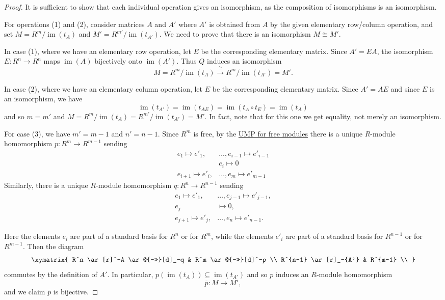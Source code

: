 \documentclass[12pt]{report}
\numberwithin{equation}{section}
\numberwithin{theorem}{chapter}
\theoremstyle{definition}
\newtheorem*{basic properties}{Basic Properties}
\newtheorem*{Important Remark}{Important Remark}
\DeclareMathOperator{\im}{im}
\begin{document}
\begin{proof}
It is sufficient to show that each individual operation gives an isomorphism, as the composition of isomorphisms is an isomorphism.

For operations (1) and (2), consider matrices $A$ and $A'$ where $A'$ is obtained from $A$ by the given elementary row/column operation, and set $M = R^m/\im(t_A)$ and $M' = R^{m'}/\im(t_{A'})$. We need to prove that there is an isomorphism $M \cong M'$.

In case (1), where we have an elementary row operation, let $E$ be the corresponding elementary matrix. Since $A' = E A$, the isomorphism $E: R^n \to R^n$ maps $\im(A)$ bijectively onto $\im(A')$. Thus $Q$ induces an isomorphism
$$M = R^m/\im(t_A) \xrightarrow{\cong} R^m/\im(t_{A'}) = M'.$$

In case (2), where we have an elementary column operation, let $E$ be the corresponding elementary matrix. Since $A'=AE$ and since $E$ is an isomorphism, we have 
$$\im(t_{A'}) = \im(t_{AE})=\im(t_A\circ t_E)=\im(t_A)$$ 
and so $m=m'$ and $M = R^m/\im(t_A) = R^{m'}/\im(t_{A'}) = M'$. In fact, note that for this one we get equality, not merely an isomorphism.

For case (3), we have $m'=m-1$ and $n'=n-1$. 
Since $R^m$ is free, by the \hyperref[UMPfreemod]{UMP for free modules} there is a unique $R$-module homomorphism
$p\!: R^{m} \to R^{m-1}$ sending 
$$\begin{aligned}
e_1 \mapsto e'_1, & \ldots, e_{i-1} \mapsto e'_{i-1}\\
& e_i \mapsto 0\\
e_{i+1} \mapsto e'_{i}, & \ldots, e_{m} \mapsto e'_{m-1}
\end{aligned}$$
Similarly, there is a unique $R$-module homomorphism $q\!: R^{n} \to R^{n-1}$ sending 
$$\begin{aligned}
	e_1 \mapsto e'_1, &\ldots, e_{j-1} \mapsto e'_{j-1}, \\
	e_j &\mapsto 0, \\
	e_{j+1} \mapsto e'_{j}, &\ldots, e_n \mapsto e'_{n-1}.
\end{aligned}$$

Here the elements $e_i$ are part of a standard basis for $R^n$ or for $R^m$, while the elements $e'_i$ are part of a standard basis for $R^{n-1}$ or for $R^{m-1}$.
Then the diagram
$$\xymatrix{
R^n \ar[r]^-A \ar@{->>}[d]_-q & R^m \ar@{->>}[d]^-p \\
R^{n-1} \ar[r]_-{A'}  & R^{m-1} \\
}$$
commutes by the definition of $A'$. In particular, $p(\im(t_A)) \subseteq \im(t_{A'})$ and so $p$ induces an $R$-module  homomorphism
$$\overline{p}\!: M \to M',$$
and we claim $\overline{p}$ is bijective.


\end{proof}
\end{document}
